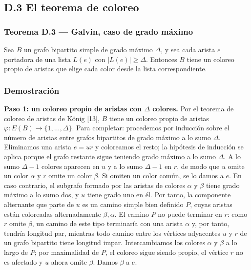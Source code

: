 \documentclass[
  spanish,
  11pt,
  a4paper,
]{article}
\begin{document}
\subsection{D.3 El teorema de coloreo}\label{d.3-el-teorema-de-coloreo}

\subsubsection{Teorema D.3 --- Galvin, caso de grado máximo}\label{teorema-d.3-galvin-caso-de-grado-muxe1ximo}

Sea \(B\) un grafo bipartito simple de grado máximo \(\Delta\), y sea cada arista \(e\) portadora de una lista \(L(e)\) con \(|L(e)|\ge\Delta\). Entonces \(B\) tiene un coloreo propio de aristas que elige cada color desde la lista correspondiente.

\subsubsection{Demostración}\label{demostraciuxf3n-11}

\textbf{Paso 1: un coloreo propio de aristas con \(\Delta\) colores.} Por el teorema de coloreo de aristas de König {[}13{]}, \(B\) tiene un coloreo propio de aristas \(\varphi:E(B)\to\{1,\ldots,\Delta\}\). Para completar: procedemos por inducción sobre el número de aristas entre grafos bipartitos de grado máximo a lo sumo \(\Delta\). Eliminamos una arista \(e=ur\) y coloreamos el resto; la hipótesis de inducción se aplica porque el grafo restante sigue teniendo grado máximo a lo sumo \(\Delta\). A lo sumo \(\Delta-1\) colores aparecen en \(u\) y a lo sumo \(\Delta-1\) en \(r\), de modo que \(u\) omite un color \(\alpha\) y \(r\) omite un color \(\beta\). Si omiten un color común, se lo damos a \(e\). En caso contrario, el subgrafo formado por las aristas de colores \(\alpha\) y \(\beta\) tiene grado máximo a lo sumo dos, y \(u\) tiene grado uno en él. Por tanto, la componente alternante que parte de \(u\) es un camino simple bien definido \(P\), cuyas aristas están coloreadas alternadamente \(\beta,\alpha\). El camino \(P\) no puede terminar en \(r\): como \(r\) omite \(\beta\), un camino de este tipo terminaría con una arista \(\alpha\) y, por tanto, tendría longitud par, mientras todo camino entre los vértices adyacentes \(u\) y \(r\) de un grafo bipartito tiene longitud impar. Intercambiamos los colores \(\alpha\) y \(\beta\) a lo largo de \(P\); por maximalidad de \(P\), el coloreo sigue siendo propio, el vértice \(r\) no es afectado y \(u\) ahora omite \(\beta\). Damos \(\beta\) a \(e\).
\end{document}
